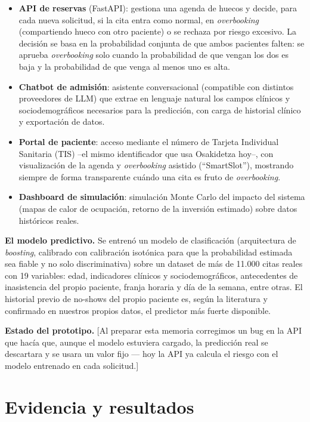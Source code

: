 \documentclass[11pt,a4paper]{article}
\begin{document}
\begin{itemize}
  \item \textbf{API de reservas} (FastAPI): gestiona una agenda de huecos y decide, para cada nueva solicitud, si la cita entra como normal, en \textit{overbooking} (compartiendo hueco con otro paciente) o se rechaza por riesgo excesivo. La decisión se basa en la probabilidad conjunta de que ambos pacientes falten: se aprueba \textit{overbooking} solo cuando la probabilidad de que vengan los dos es baja y la probabilidad de que venga al menos uno es alta.
  \item \textbf{Chatbot de admisión}: asistente conversacional (compatible con distintos proveedores de LLM) que extrae en lenguaje natural los campos clínicos y sociodemográficos necesarios para la predicción, con carga de historial clínico y exportación de datos.
  \item \textbf{Portal de paciente}: acceso mediante el número de Tarjeta Individual Sanitaria (TIS) --el mismo identificador que usa Osakidetza hoy--, con visualización de la agenda y \textit{overbooking} asistido (``SmartSlot''), mostrando siempre de forma transparente cuándo una cita es fruto de \textit{overbooking}.
  \item \textbf{Dashboard de simulación}: simulación Monte Carlo del impacto del sistema (mapas de calor de ocupación, retorno de la inversión estimado) sobre datos históricos reales.
\end{itemize}

\textbf{El modelo predictivo.} Se entrenó un modelo de clasificación (arquitectura de \textit{boosting}, calibrado con calibración isotónica para que la probabilidad estimada sea fiable y no solo discriminativa) sobre un dataset de más de 11.000 citas reales con 19 variables: edad, indicadores clínicos y sociodemográficos, antecedentes de inasistencia del propio paciente, franja horaria y día de la semana, entre otras. El historial previo de no-shows del propio paciente es, según la literatura y confirmado en nuestros propios datos, el predictor más fuerte disponible.

\textbf{Estado del prototipo.} [Al preparar esta memoria corregimos un bug en la API que hacía que, aunque el modelo estuviera cargado, la predicción real se descartara y se usara un valor fijo --- hoy la API ya calcula el riesgo con el modelo entrenado en cada solicitud.]

\section{Evidencia y resultados}
\end{document}
